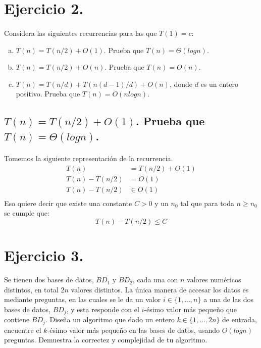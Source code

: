 \documentclass[12pt]{article}
\begin{document}
\section{Ejercicio 2.}
\paragraph{} Considera las siguientes recurrencias para las que $T(1)=c$:
\begin{enumerate}[a)]
\item $T(n)=T(n/2) + O(1)$. Prueba que $T(n)=\Theta(logn)$.
\item $T(n)=T(n/2) + O(n)$. Prueba que $T(n)=O(n)$.
\item $T(n)=T(n/d) + T(n(d-1)/d) + O(n)$, donde $d$ es un entero positivo. Prueba que $T(n)=O(nlogn)$.
\end{enumerate}
\subsection{$T(n)=T(n/2) + O(1)$. Prueba que $T(n)=\Theta(logn)$.}
\paragraph{} Tomemos la siguiente representación de la recurrencia.
\begin{equation}
\begin{split}
T(n) & =T(n/2) + O(1) \\
T(n) - T(n/2) & = O(1) \\
T(n) - T(n/2) & \in O(1) \\
\end{split}
\end{equation}
Eso quiere decir que existe una constante $C>0$ y un $n_0$ tal que para toda  $n\geq n_0$ se cumple que:
 \begin{equation}
	T(n)-T(n/2) \leq C
 \end{equation}
\section{Ejercicio 3.}
Se tienen dos bases de datos, $BD_1$ y $BD_2$, cada una con $n$ valores numéricos distintos, en total $2n$ valores distintos. La única manera de accesar los datos es mediante preguntas, en las cuales se le da un valor $i\in\{1,..., n\}$ a una de las dos bases de datos, $BD_j$, y esta responde con el $i$-ésimo valor más pequeño que contiene $BD_j$. Diseña un algoritmo que dado un entero $k\in\{1,...,2n\}$ de entrada, encuentre el $k$-ésimo valor más pequeño en las bases de datos, usando $O(logn)$ preguntas. Demuestra la correctez y complejidad de tu algoritmo.
\end{document}
